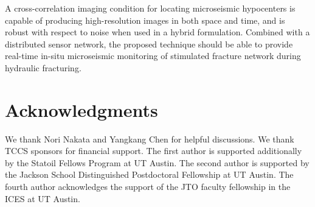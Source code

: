 A cross-correlation imaging condition for locating microseismic hypocenters is capable of producing high-resolution images in both space and time, and is robust with respect to noise when used in a hybrid formulation. Combined with a distributed sensor network, the proposed technique should be able to provide real-time in-situ microseismic monitoring of stimulated fracture network during hydraulic fracturing.

\section{Acknowledgments}
We thank Nori Nakata and Yangkang Chen for helpful discussions. We thank TCCS sponsors for financial support. The first author is supported additionally by the Statoil Fellows Program at UT Austin. The second author is supported by the Jackson School Distinguished Postdoctoral Fellowship at UT Austin. The fourth author acknowledges the support of the JTO faculty fellowship in the ICES at UT Austin.




